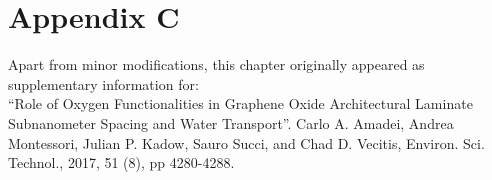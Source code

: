 \chapter{Appendix C}
\thispagestyle{plain}
\vspace{-.5cm}

\noindent Apart from minor modifications, this chapter originally appeared  as supplementary information for:\newline\\
\ssp ``Role of Oxygen Functionalities in Graphene Oxide Architectural Laminate Subnanometer Spacing and Water Transport''.
Carlo A. Amadei, Andrea Montessori, Julian P. Kadow, Sauro Succi, and Chad D. Vecitis, Environ. Sci. Technol., 2017, 51 (8), pp 4280-4288.

    \dsp


